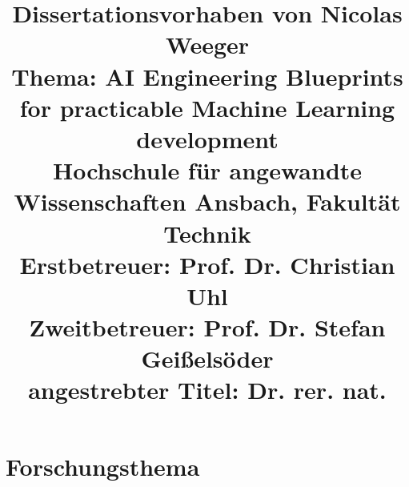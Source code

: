 \documentclass[11pt,a4paper,pointlessnumbers]{scrartcl}
\renewcommand{\normalsize}{\fontsize{11pt}{13.2pt}\selectfont}
\theoremstyle{break}
\numberwithin{equation}{section}
\begin{document}
\pagestyle{fancy}
\fancyhf{}
\fancyhead[L]{\textit{\nouppercase{\leftmark}}}
\fancyhead[R]{\thepage}
\date{}
\title{\textbf{Dissertationsvorhaben von Nicolas Weeger} 
\\{Thema: AI Engineering Blueprints for practicable Machine Learning development}
\\{\normalsize Hochschule für angewandte Wissenschaften Ansbach, Fakultät Technik}
\\{\normalsize Erstbetreuer: Prof. Dr. Christian Uhl}\vspace{-.5em}
\\{\normalsize Zweitbetreuer: Prof. Dr. Stefan Geißelsöder}
\\{\normalsize angestrebter Titel: Dr. rer. nat.}}
\maketitle
\vspace{-14ex}

\thispagestyle{empty}
\section{Forschungsthema} \label{kap:motivation}
\end{document}
